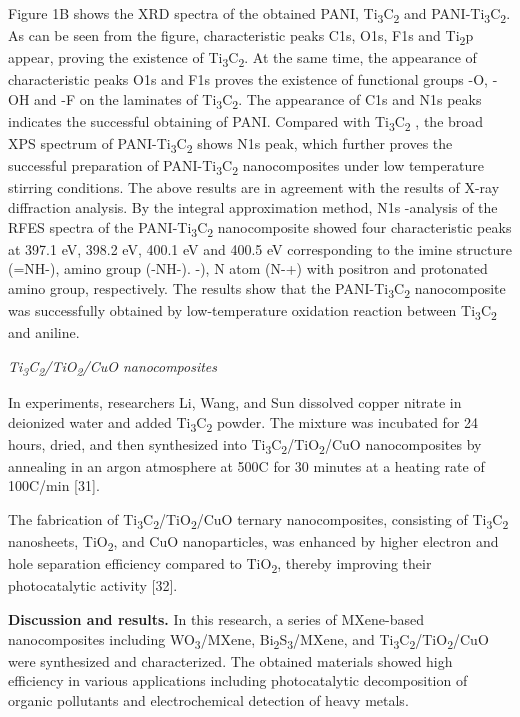 \begin{multicols}{2}
Figure 1B shows the XRD spectra of the obtained PANI,
Ti\textsubscript{3}C\textsubscript{2} and
PANI-Ti\textsubscript{3}C\textsubscript{2}. As can be seen from
the figure, characteristic peaks C1s, O1s, F1s and
Ti\textsubscript{2}p appear, proving the existence of
Ti\textsubscript{3}C\textsubscript{2}. At the same time, the
appearance of characteristic peaks O1s and F1s proves the
existence of functional groups -O, -OH and -F on the laminates of
Ti\textsubscript{3}C\textsubscript{2}. The appearance of C1s and
N1s peaks indicates the successful obtaining of PANI. Compared
with Ti\textsubscript{3}C\textsubscript{2} , the broad XPS
spectrum of PANI-Ti\textsubscript{3}C\textsubscript{2} shows N1s
peak, which further proves the successful preparation of
PANI-Ti\textsubscript{3}C\textsubscript{2} nanocomposites under
low temperature stirring conditions. The above results are in
agreement with the results of X-ray diffraction analysis. By the
integral approximation method, N1s -analysis of the RFES spectra
of the PANI-Ti\textsubscript{3}C\textsubscript{2}
nan\textsubscript{}ocomposite showed four characteristic peaks at
397.1 eV, 398.2 eV, 400.1 eV and 400.5 eV corresponding to the
imine structure (=NH-), amino group (-NH-). -), N atom (N-+) with
positron and protonated amino group, respectively. The results
show that the PANI-Ti\textsubscript{3}C\textsubscript{2}
nanocomposite was successfully obtained by low-temperature
oxidation reaction between Ti\textsubscript{3}C\textsubscript{2}
and aniline.

\emph{Ti\textsubscript{3}C\textsubscript{2}/TiO\textsubscript{2}/CuO
nanocomposites}

In experiments, researchers Li, Wang, and Sun dissolved copper
nitrate in deionized water and added
Ti\textsubscript{3}C\textsubscript{2} powder. The mixture was
incubated for 24 hours, dried, and then synthesized into
Ti\textsubscript{3}C\textsubscript{2}/TiO\textsubscript{2}/CuO
nanocomposites by annealing in an argon atmosphere at 500C for 30
minutes at a heating rate of 100C/min {[}31{]}. \hl{}

The fabrication of
Ti\textsubscript{3}C\textsubscript{2}/TiO\textsubscript{2}/CuO
ternary nanocomposites, consisting of
Ti\textsubscript{3}C\textsubscript{2} nanosheets,
TiO\textsubscript{2}, and CuO nanoparticles, was enhanced by
higher electron and hole separation efficiency compared to
TiO\textsubscript{2}, thereby improving their photocatalytic
activity {[}32{]}.

{\bfseries Discussion and results.} In this research, a series of
MXene-based nanocomposites including WO\textsubscript{3}/MXene,
Bi\textsubscript{2}S\textsubscript{3}/MXene, and
Ti\textsubscript{3}C\textsubscript{2}/TiO\textsubscript{2}/CuO were
synthesized and characterized. The obtained materials showed
high efficiency in various applications including photocatalytic
decomposition of organic pollutants and electrochemical detection
of heavy metals.


\end{multicols}

